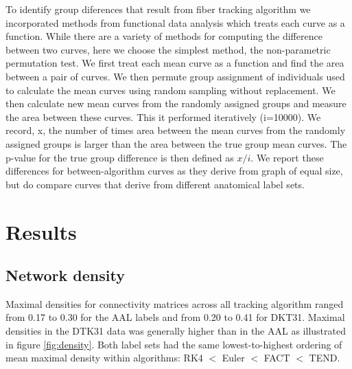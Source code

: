 \documentclass{frontiersSCNS} %
\begin{document}
To identify group diferences that result from fiber tracking algorithm we incorporated methods from functional data analysis which treats each curve as a function. While there are a variety of methods for computing the difference between two curves, here we choose the simplest method, the non-parametric permutation test. We first treat each mean curve as a function and find the area between a pair of curves. We then permute group assignment of individuals used to calculate the mean curves using random sampling without replacement. We then calculate new mean curves from the randomly assigned groups and measure the area between these curves. This it performed iteratively (i=10000). We record, x, the number of times area between the mean curves from the randomly assigned groups is larger than the area between the true group mean curves. The p-value for the true group difference is then defined as $x/i$. We report these differences for between-algorithm curves as they derive from graph of equal size, but do compare curves that derive from different anatomical label sets.



\section{Results}
\subsection{Network density}
Maximal densities for connectivity matrices across all tracking algorithm ranged from 0.17 to 0.30 for the AAL labels and from 0.20 to 0.41 for DKT31. Maximal densities in the DTK31 data was generally higher than in the AAL as illustrated in figure \ref{fig:density}. Both label sets had the same lowest-to-highest ordering of mean maximal density within algorithms: RK4 $<$ Euler $<$ FACT $<$ TEND.
\end{document}
